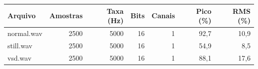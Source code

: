 \begin{tabular}{lrrrrrr}
\toprule
\textbf{Arquivo} & \textbf{Amostras} & \textbf{Taxa (Hz)} & \textbf{Bits} & \textbf{Canais} & \textbf{Pico (\%)} & \textbf{RMS (\%)} \\
\midrule
normal.wav & 2500 & 5000 & 16 & 1 & 92{,}7 & 10{,}9 \\
still.wav & 2500 & 5000 & 16 & 1 & 54{,}9 & 8{,}5 \\
vsd.wav & 2500 & 5000 & 16 & 1 & 88{,}1 & 17{,}6 \\
\bottomrule
\end{tabular}
